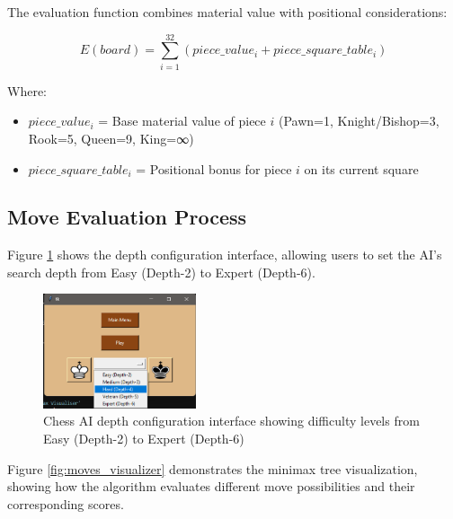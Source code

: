 \documentclass[11pt,a4paper]{report}
\begin{document}
The evaluation function combines material value with positional considerations:

\begin{equation}
E(board) = \sum_{i=1}^{32} (piece\_value_i + piece\_square\_table_i)
\end{equation}

Where:
\begin{itemize}
    \item $piece\_value_i$ = Base material value of piece $i$ (Pawn=1, Knight/Bishop=3, Rook=5, Queen=9, King=∞)
    \item $piece\_square\_table_i$ = Positional bonus for piece $i$ on its current square
\end{itemize}

\subsection{Move Evaluation Process}
Figure \ref{fig:depth_setting} shows the depth configuration interface, allowing users to set the AI's search depth from Easy (Depth-2) to Expert (Depth-6).

\begin{figure}[H]
    \centering
    \includegraphics[width=0.4\textwidth]{images/depth_setting.png}
    \caption{Chess AI depth configuration interface showing difficulty levels from Easy (Depth-2) to Expert (Depth-6)}
    \label{fig:depth_setting}
\end{figure}

Figure \ref{fig:moves_visualizer} demonstrates the minimax tree visualization, showing how the algorithm evaluates different move possibilities and their corresponding scores.
\end{document}
